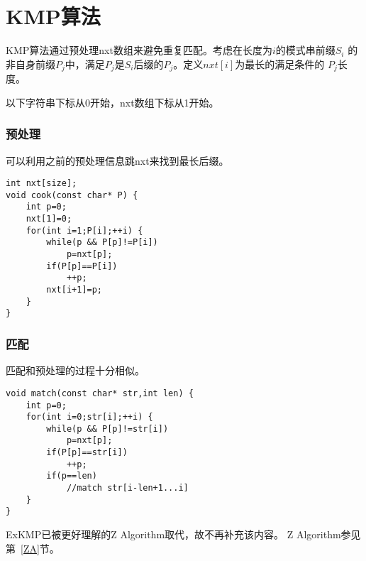 \section{KMP算法}

KMP算法通过预处理nxt数组来避免重复匹配。考虑在长度为$i$的模式串前缀$S_i$
的非自身前缀$P_j$中，满足$P_j$是$S_i$后缀的$P_j$。定义$nxt[i]$为最长的满足条件的
$P_j$长度。

以下字符串下标从0开始，nxt数组下标从1开始。
\subsubsection{预处理}
可以利用之前的预处理信息跳nxt来找到最长后缀。
\begin{lstlisting}
int nxt[size];
void cook(const char* P) {
    int p=0;
    nxt[1]=0;
    for(int i=1;P[i];++i) {
        while(p && P[p]!=P[i])
            p=nxt[p];
        if(P[p]==P[i])
            ++p;
        nxt[i+1]=p;
    }
}
\end{lstlisting}
\subsubsection{匹配}
匹配和预处理的过程十分相似。
\begin{lstlisting}
void match(const char* str,int len) {
    int p=0;
    for(int i=0;str[i];++i) {
        while(p && P[p]!=str[i])
            p=nxt[p];
        if(P[p]==str[i])
            ++p;
        if(p==len)
            //match str[i-len+1...i]
    }
}
\end{lstlisting}

ExKMP已被更好理解的Z Algorithm取代，故不再补充该内容。
Z Algorithm参见第~\ref{ZA}节。

